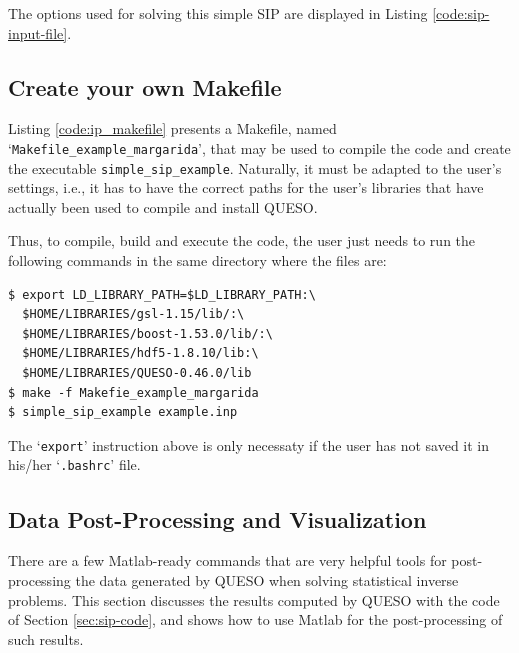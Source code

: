 The options used for solving this simple SIP are displayed in Listing \ref{code:sip-input-file}.





\subsection{Create your own Makefile}\label{sec:sip-makefile}

 
Listing \ref{code:ip_makefile} presents a Makefile, named `\texttt{Makefile\_example\_margarida}', that may be used to compile the code and create the executable \verb+simple_sip_example+. Naturally, it must be adapted to the user's settings, i.e., it has to have the correct paths for the user's libraries that have actually been used to compile and install QUESO.



Thus, to compile, build and execute the code, the user just needs to run the following commands in the same directory where the files are:
\begin{lstlisting}
$ export LD_LIBRARY_PATH=$LD_LIBRARY_PATH:\
  $HOME/LIBRARIES/gsl-1.15/lib/:\
  $HOME/LIBRARIES/boost-1.53.0/lib/:\
  $HOME/LIBRARIES/hdf5-1.8.10/lib:\
  $HOME/LIBRARIES/QUESO-0.46.0/lib 
$ make -f Makefie_example_margarida 
$ simple_sip_example example.inp
\end{lstlisting}

The `\verb+export+' instruction above is only necessaty if the user has not saved it in his/her `\verb+.bashrc+' file.


\subsection{Data Post-Processing and Visualization}\label{sec:sip-results}


There are a few Matlab-ready commands that are very helpful tools for post-processing the data generated by QUESO when solving statistical inverse problems. This section discusses the results computed by QUESO with the code of Section \ref{sec:sip-code}, and shows how to use Matlab for the post-processing of such results. 

